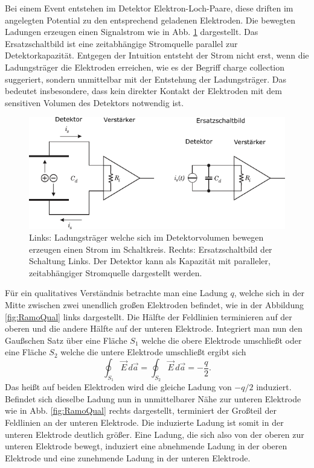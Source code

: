 Bei einem Event entstehen im Detektor Elektron-Loch-Paare, diese driften im angelegten Potential zu den entsprechend geladenen Elektroden.
Die bewegten Ladungen erzeugen einen Signalstrom wie in Abb. \ref{fig:RamoEq} dargestellt.
Das Ersatzschaltbild ist eine zeitabhängige Stromquelle parallel zur Detektorkapazität.
Entgegen der Intuition entsteht der Strom nicht erst, wenn die Ladungsträger die Elektroden erreichen, wie es der Begriff charge collection suggeriert, sondern unmittelbar mit der Entstehung der Ladungsträger.
Das bedeutet insbesondere, dass kein direkter Kontakt der Elektroden mit dem sensitiven Volumen des Detektors notwendig ist.

\begin{figure}[!b]
\begin{center}
\includegraphics[scale=1.25]{./fig/RamoEquivalent.pdf}
\end{center}
\vspace{-0.5cm}
\caption{Links: Ladungsträger welche sich im Detektorvolumen bewegen erzeugen einen Strom im Schaltkreis. Rechts: Ersatzschaltbild der Schaltung Links. Der Detektor kann als Kapazität mit paralleler, zeitabhängiger Stromquelle dargestellt werden.\cite{Editors}}
\label{fig:RamoEq}
\end{figure}

Für ein qualitatives Verständnis betrachte man eine Ladung $q$, welche sich in der Mitte zwischen zwei unendlich großen Elektroden befindet, wie in der Abbildung \ref{fig:RamoQual} links dargestellt.
Die Hälfte der Feldlinien terminieren auf der oberen und die andere Hälfte auf der unteren Elektrode.
Integriert man nun den Gaußschen Satz über eine Fläche $S_1$ welche die obere Elektrode umschließt oder eine Fläche $S_2$ welche die untere Elektrode umschließt ergibt sich
\begin{equation}
\oint_{S_1} \vec{E} \,d\vec{a} = \oint_{S_2} \vec{E} \,d\vec{a} = -\frac{q}{2}.
\end{equation}
Das heißt auf beiden Elektroden wird die gleiche Ladung von $-q/2$ induziert.
Befindet sich dieselbe Ladung nun in unmittelbarer Nähe zur unteren Elektrode wie in Abb. \ref{fig:RamoQual} rechts dargestellt, terminiert der Großteil der Feldlinien an der unteren Elektrode.
Die induzierte Ladung ist somit in der unteren Elektrode deutlich größer.
Eine Ladung, die sich also von der oberen zur unteren Elektrode bewegt, induziert eine abnehmende Ladung in der oberen Elektrode und eine zunehmende Ladung in der unteren Elektrode.\cite{Editors}

